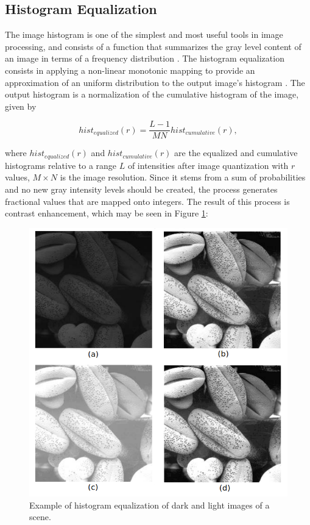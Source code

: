 \subsection{Histogram Equalization}

The image histogram is one of the simplest and most useful tools in image processing, and consists of a function that summarizes the gray level content of an image in terms of a frequency distribution \cite{castleman1996digital}. The histogram equalization consists in applying a non-linear monotonic mapping to provide an approximation of an uniform distribution to the output image's histogram \cite{gonzalez2018digital}. The output histogram is a normalization of the cumulative histogram of the image, given by

\begin{equation}
\label{eqn:histogram_equalization}
hist_{equalized}(r) = \frac{L - 1}{MN} hist_{cumulative}(r),
\end{equation}

\noindent where $hist_{equalized}(r)$ and $hist_{cumulative}(r)$ are the equalized and cumulative histograms relative to a range $L$ of intensities after image quantization with $r$ values, $M \times N$ is the image resolution. Since it stems from a sum of probabilities and no new gray intensity levels should be created, the process generates fractional values that are mapped onto integers. The result of this process is contrast enhancement, which may be seen in Figure \ref{fig:histogram_equalization}:

\begin{figure}[htb]
	\centering
	\caption{\label{fig:histogram_equalization} Example of histogram equalization of dark and light images of a scene.} 
	\begin{center}
	    \includegraphics[scale=0.5]{images/histogram_equalization.png}
	\end{center}
	\centering
\end{figure}

